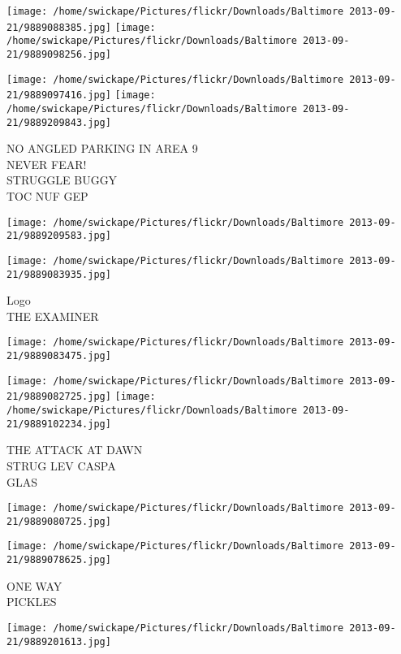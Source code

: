 \documentclass[10pt,letterpaper]{article}
\begin{document}
\texttt{[image: /home/swickape/Pictures/flickr/Downloads/Baltimore 2013-09-21/9889088385.jpg]}
\texttt{[image: /home/swickape/Pictures/flickr/Downloads/Baltimore 2013-09-21/9889098256.jpg]}

\texttt{[image: /home/swickape/Pictures/flickr/Downloads/Baltimore 2013-09-21/9889097416.jpg]}
\texttt{[image: /home/swickape/Pictures/flickr/Downloads/Baltimore 2013-09-21/9889209843.jpg]}

NO ANGLED PARKING IN AREA 9\\
NEVER FEAR!\\
STRUGGLE BUGGY\\
TOC NUF GEP\\
\pagebreak

\texttt{[image: /home/swickape/Pictures/flickr/Downloads/Baltimore 2013-09-21/9889209583.jpg]}

\vspace{0.25in}
\texttt{[image: /home/swickape/Pictures/flickr/Downloads/Baltimore 2013-09-21/9889083935.jpg]}

Logo\\
THE EXAMINER\\
\pagebreak

\texttt{[image: /home/swickape/Pictures/flickr/Downloads/Baltimore 2013-09-21/9889083475.jpg]}

\vspace{0.25in}
\texttt{[image: /home/swickape/Pictures/flickr/Downloads/Baltimore 2013-09-21/9889082725.jpg]}
\texttt{[image: /home/swickape/Pictures/flickr/Downloads/Baltimore 2013-09-21/9889102234.jpg]}

THE ATTACK AT DAWN\\
STRUG LEV CASPA\\
GLAS\\
\pagebreak

\texttt{[image: /home/swickape/Pictures/flickr/Downloads/Baltimore 2013-09-21/9889080725.jpg]}

\vspace{0.25in}
\texttt{[image: /home/swickape/Pictures/flickr/Downloads/Baltimore 2013-09-21/9889078625.jpg]}

ONE WAY\\
PICKLES\\
\pagebreak

\texttt{[image: /home/swickape/Pictures/flickr/Downloads/Baltimore 2013-09-21/9889201613.jpg]}
\end{document}
